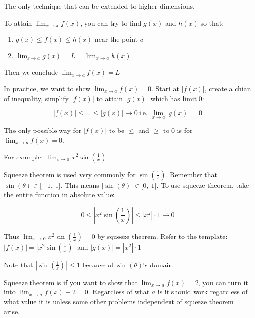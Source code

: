 \documentclass[12pt]{article}
\theoremstyle{plain}
\theoremstyle{remark}
\theoremstyle{definition}
\begin{document}
The only technique that can be extended to higher dimensions.

To attain \(\lim_{x \rightarrow a}{f(x)}\), you can try to find \(g(x)\)
and \(h(x)\) so that:

\begin{enumerate}
\def\labelenumi{\arabic{enumi}.}
\item
  \(g(x) \leq f(x) \leq h(x)\) near the point \(a\)
\item
  \(\lim_{x \rightarrow a}{g(x) = L = \lim_{x \rightarrow a}{h(x)}}\)
\end{enumerate}

Then we conclude \(\lim_{x \rightarrow a}{f(x) = L}\)

In practice, we want to show \(\lim_{x \rightarrow a}{f(x) = 0}\). Start
at \(|f(x)|\), create a chian of inequality, simplify \(|f(x)|\) to
attain \(|g(x)|\) which has limit 0:

\[\left| f(x) \right| \leq \ldots \leq \left| g(x) \right| \rightarrow 0\ \text{i.e.\ }\lim_{x \rightarrow a}{\left| g(x) \right| = 0}\]

The only possible way for \(\left| f(x) \right|\) to be \(\leq\) and
\(\geq\) to 0 is for \(\lim_{x \rightarrow a}{f(x) = 0}.\)

For example:
\(\lim_{x \rightarrow 0}{x^{2}\sin\left( \frac{1}{x} \right)}\)

Squeeze theorem is used very commonly for
\(\sin\left( \frac{1}{x} \right)\). Remember that
\(\sin(\theta) \in \lbrack - 1,\ 1\rbrack\). This means
\(\left| \sin(\theta) \right| \in \lbrack 0,\ 1\rbrack\). To use squeeze
theorem, take the entire function in absolute value:

\[0 \leq \left| x^{2}\sin\left( \frac{1}{x} \right) \right| \leq \left| x^{2} \right| \cdot 1 \rightarrow 0\]

Thus \(\lim_{x \rightarrow 0}{x^{2}\sin\left( \frac{1}{x} \right)} = 0\)
by squeeze theorem. Refer to the template:
\(\left| f(x) \right| = \left| x^{2}\sin\left( \frac{1}{x} \right) \right|\)
and \(\left| g(x) \right| = \left| x^{2} \right| \cdot 1\)

Note that \(\left| \sin\left( \frac{1}{x} \right) \right| \leq 1\)
because of \(\sin(\theta)\)'s domain.

Squeeze theorem is if you want to show that
\(\lim_{x \rightarrow a}{f(x) = 2}\), you can turn it into
\(\lim_{x \rightarrow a}{f(x) - 2 = 0}\). Regardless of what \(a\) is it
should work regardless of what value it is unless some other problems
independent of squeeze theorem arise.
\end{document}
